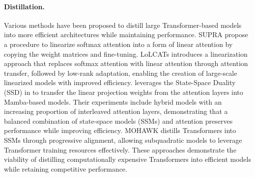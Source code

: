 \paragraph{Distillation.}
Various methods have been proposed to distill large Transformer-based models into more efficient architectures while maintaining performance.
SUPRA \citep{mercat2024linearizing} propose a procedure to linearize softmax attention into a form of linear attention by copying the weight matrices and fine-tuning.
LoLCATs \citep{lolcats} introduces a linearization approach that replaces softmax attention with linear attention through attention transfer, followed by low-rank adaptation, enabling the creation of large-scale linearized models with improved efficiency. 
\citep{wang2025} leverages the State-Space Duality (SSD) in \citet{mamba2} to transfer the linear projection weights from the attention layers into Mamba-based models. Their experiments include hybrid models with an increasing proportion of interleaved attention layers, demonstrating that a balanced combination of state-space models (SSMs) and attention preserves performance while improving efficiency.
MOHAWK \citep{mohawk} distills Transformers into SSMs through progressive alignment, allowing subquadratic models to leverage Transformer training resources effectively. These approaches demonstrate the viability of distilling computationally expensive Transformers into efficient models while retaining competitive performance.